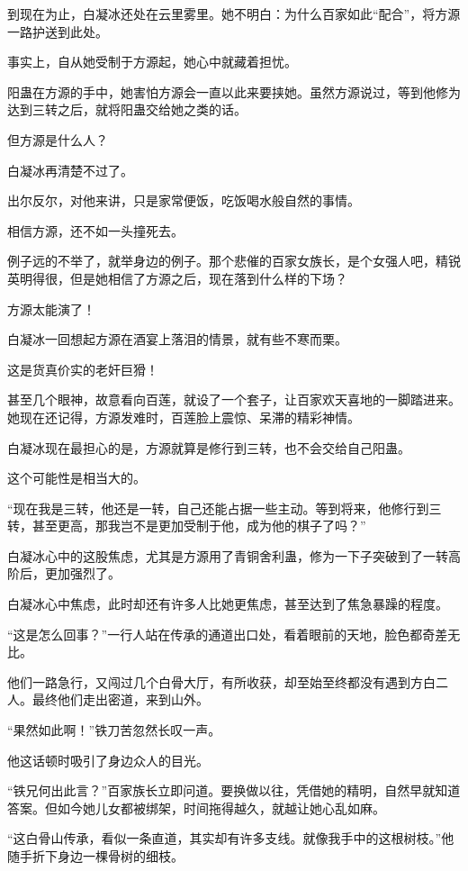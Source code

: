 \begin{this_body}
到现在为止，白凝冰还处在云里雾里。她不明白：为什么百家如此“配合”，将方源一路护送到此处。

事实上，自从她受制于方源起，她心中就藏着担忧。

阳蛊在方源的手中，她害怕方源会一直以此来要挟她。虽然方源说过，等到他修为达到三转之后，就将阳蛊交给她之类的话。

但方源是什么人？

白凝冰再清楚不过了。

出尔反尔，对他来讲，只是家常便饭，吃饭喝水般自然的事情。

相信方源，还不如一头撞死去。

例子远的不举了，就举身边的例子。那个悲催的百家女族长，是个女强人吧，精锐英明得很，但是她相信了方源之后，现在落到什么样的下场？

方源太能演了！

白凝冰一回想起方源在酒宴上落泪的情景，就有些不寒而栗。

这是货真价实的老奸巨猾！

甚至几个眼神，故意看向百莲，就设了一个套子，让百家欢天喜地的一脚踏进来。她现在还记得，方源发难时，百莲脸上震惊、呆滞的精彩神情。

白凝冰现在最担心的是，方源就算是修行到三转，也不会交给自己阳蛊。

这个可能性是相当大的。

“现在我是三转，他还是一转，自己还能占据一些主动。等到将来，他修行到三转，甚至更高，那我岂不是更加受制于他，成为他的棋子了吗？”

白凝冰心中的这股焦虑，尤其是方源用了青铜舍利蛊，修为一下子突破到了一转高阶后，更加强烈了。

白凝冰心中焦虑，此时却还有许多人比她更焦虑，甚至达到了焦急暴躁的程度。

“这是怎么回事？”一行人站在传承的通道出口处，看着眼前的天地，脸色都奇差无比。

他们一路急行，又闯过几个白骨大厅，有所收获，却至始至终都没有遇到方白二人。最终他们走出密道，来到山外。

“果然如此啊！”铁刀苦忽然长叹一声。

他这话顿时吸引了身边众人的目光。

“铁兄何出此言？”百家族长立即问道。要换做以往，凭借她的精明，自然早就知道答案。但如今她儿女都被绑架，时间拖得越久，就越让她心乱如麻。

“这白骨山传承，看似一条直道，其实却有许多支线。就像我手中的这根树枝。”他随手折下身边一棵骨树的细枝。


\end{this_body}
